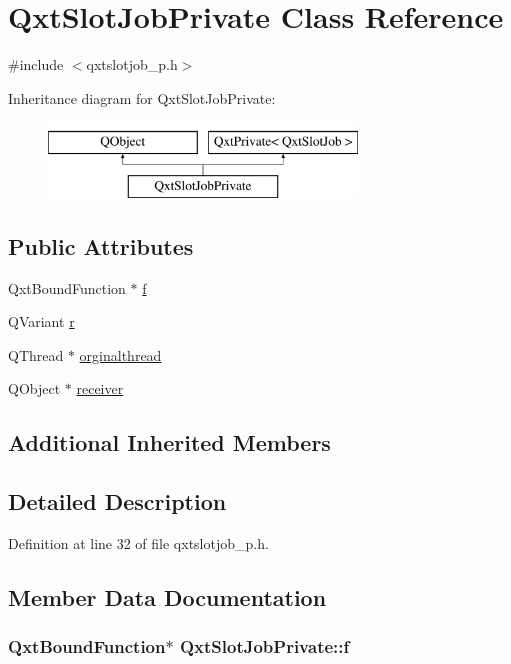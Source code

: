 \hypertarget{class_qxt_slot_job_private}{\section{Qxt\-Slot\-Job\-Private Class Reference}
\label{class_qxt_slot_job_private}
}


{\ttfamily \#include $<$qxtslotjob\-\_\-p.\-h$>$}

Inheritance diagram for Qxt\-Slot\-Job\-Private\-:\begin{figure}[H]
\begin{center}
\leavevmode
\includegraphics[height=2.000000cm]{class_qxt_slot_job_private}
\end{center}
\end{figure}
\subsection*{Public Attributes}
\begin{DoxyCompactItemize}
\item 
Qxt\-Bound\-Function $\ast$ \hyperlink{class_qxt_slot_job_private_a0d10e41b2eec5e5c5e953dcc8468422e}{f}
\item 
Q\-Variant \hyperlink{class_qxt_slot_job_private_a39930b4d6454334df4d35a36727cf7c5}{r}
\item 
Q\-Thread $\ast$ \hyperlink{class_qxt_slot_job_private_a84859f360af208bb366408fadc1f0a4a}{orginalthread}
\item 
Q\-Object $\ast$ \hyperlink{class_qxt_slot_job_private_a9b3127524a9fd9fe6802b820a5cef49d}{receiver}
\end{DoxyCompactItemize}
\subsection*{Additional Inherited Members}


\subsection{Detailed Description}


Definition at line 32 of file qxtslotjob\-\_\-p.\-h.



\subsection{Member Data Documentation}
\hypertarget{class_qxt_slot_job_private_a0d10e41b2eec5e5c5e953dcc8468422e}{
\subsubsection[{f}]{\setlength{\rightskip}{0pt plus 5cm}Qxt\-Bound\-Function$\ast$ Qxt\-Slot\-Job\-Private\-::f}}\label{class_qxt_slot_job_private_a0d10e41b2eec5e5c5e953dcc8468422e}


